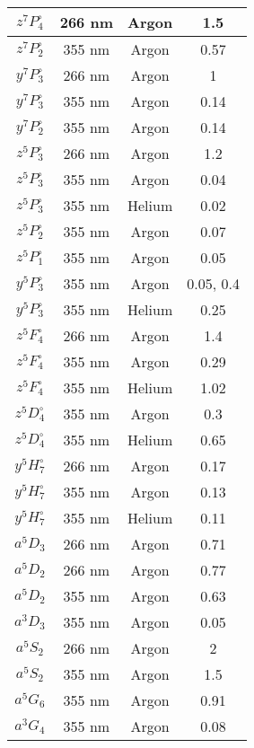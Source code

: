 \documentclass[12pt,twoside]{reedthesis}
\begin{document}
\begin{longtable}{||c|c|c|c||}
  $z^{7}P^{\circ}_{4}$ & 266 nm & Argon & 1.5 \\\hline
  $z^{7}P^{\circ}_{2}$ & 355 nm & Argon & 0.57 \\\hline
  $y^{7}P^{\circ}_{3}$ & 266 nm & Argon & 1 \\\hline
  $y^{7}P^{\circ}_{3}$ & 355 nm & Argon & 0.14 \\\hline
  $y^{7}P^{\circ}_{2}$ & 355 nm & Argon & 0.14 \\\hline
  $z^{5}P^{\circ}_{3}$ & 266 nm & Argon & 1.2 \\\hline
  $z^{5}P^{\circ}_{3}$ & 355 nm & Argon & 0.04 \\\hline
  $z^{5}P^{\circ}_{3}$ & 355 nm & Helium & 0.02 \\\hline
  $z^{5}P^{\circ}_{2}$ & 355 nm & Argon & 0.07 \\\hline
  $z^{5}P^{\circ}_{1}$ & 355 nm & Argon & 0.05 \\\hline
  $y^{5}P^{\circ}_{3}$ & 355 nm & Argon & 0.05, 0.4 \\\hline
  $y^{5}P^{\circ}_{3}$ & 355 nm & Helium & 0.25 \\\hline
  $z^{5}F^{\circ}_{4}$ & 266 nm & Argon & 1.4 \\\hline
  $z^{5}F^{\circ}_{4}$ & 355 nm & Argon & 0.29 \\\hline
  $z^{5}F^{\circ}_{4}$ & 355 nm & Helium & 1.02 \\\hline
  $z^{5}D^{\circ}_{4}$ & 355 nm & Argon & 0.3 \\\hline
  $z^{5}D^{\circ}_{4}$ & 355 nm & Helium & 0.65 \\\hline
  $y^{5}H^{\circ}_{7}$ & 266 nm & Argon & 0.17 \\\hline
  $y^{5}H^{\circ}_{7}$ & 355 nm & Argon & 0.13 \\\hline
  $y^{5}H^{\circ}_{7}$ & 355 nm & Helium & 0.11 \\\hline
  $a^{5}D_{3}$ & 266 nm & Argon & 0.71 \\\hline
  $a^{5}D_{2}$ & 266 nm & Argon & 0.77 \\\hline
  $a^{5}D_{2}$ & 355 nm & Argon & 0.63 \\\hline
  $a^{3}D_{3}$ & 355 nm & Argon & 0.05 \\\hline
  $a^{5}S_{2}$ & 266 nm & Argon & 2 \\\hline
  $a^{5}S_{2}$ & 355 nm & Argon & 1.5 \\\hline
  $a^{5}G_{6}$ & 355 nm & Argon & 0.91 \\\hline
  $a^{3}G_{4}$ & 355 nm & Argon & 0.08 \\\hline

\end{longtable}
\end{document}
